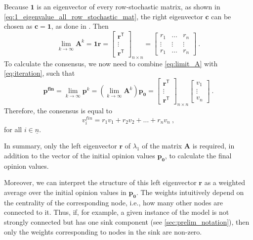 \documentclass[journal,compsoc,10pt]{IEEEtran}
\newcommand{\T}{\mathsf{T}}            %
\renewcommand{\vec}[1]{\bm{#1}}        %
\newcommand{\mat}[1]{\bm{#1}}          %
\newcommand{\ones}{\bm{1}}             %
\begin{document}
Because $\ones$ is an eigenvector of every row-stochastic matrix, as shown in \cref{eq:1_eigenvalue_all_row_stochastic_mat}, the right eigenvector $\vec{c}$ can be chosen as $\vec c = \ones$, as done in \cite{Bullo_lecture}. Then
\begin{equation}\label{eq:limit_A}
    \lim_{k\rightarrow\infty}\mat A^k= \ones \vec r = 
    \begin{bmatrix}
        \vec r^\T\\
        \vdots\\
        \vec r^\T
    \end{bmatrix}_{n\times n} = 
    \begin{bmatrix}
         r_1 & \dots &  r_n\\
        \vdots & \vdots & \vdots\\
         r_1 & \dots &  r_n
    \end{bmatrix}\ .
\end{equation}
To calculate the consensus, we now need to combine \cref{eq:limit_A} with \cref{eq:iteration}, such that
\begin{equation}\label{eq:limit_P}
    \vec{p^{fin}} = \lim_{k\rightarrow\infty}\vec p^k = (\lim_{k\rightarrow\infty}\mat A^k)\vec{p_0} = 
    \begin{bmatrix}
        \vec r^\T\\
        \vdots\\
        \vec r^\T
    \end{bmatrix}_{n\times n}
    \begin{bmatrix}
        v_1\\
        \vdots\\
        v_n
    \end{bmatrix}\ .
\end{equation}
Therefore, the consensus is equal to 
\[v^{fin}_i = r_1v_1+r_2v_2+\dots +r_nv_n \ ,\]
for all $i \in \underline{n}$.

In summary, only the left eigenvector $\vec{r}$ of $\lambda_1$ of the matrix $\mat{A}$ is required, in addition to the vector of the initial opinion values $\vec{p_0}$, to calculate the final opinion values.

Moreover, we can interpret the structure of this left eigenvector $\vec{r}$ as a weighted average over the initial opinion values in $\vec{p_0}$. The weights intuitively depend on the centrality of the corresponding node, i.e., how many other nodes are connected to it. Thus, if, for example, a given instance of the model is not strongly connected but has one sink component (see \cref{sec:prelim_notation}), then only the weights corresponding to nodes in the sink are non-zero.
\end{document}
